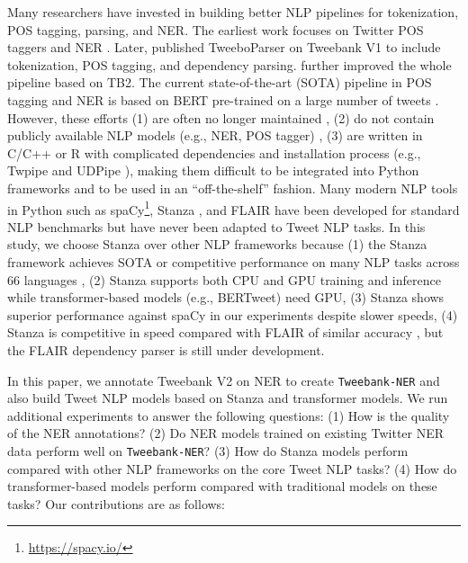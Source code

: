 \documentclass[10pt, a4paper]{article}
\begin{document}
Many researchers have invested in building better NLP pipelines for tokenization, POS tagging, parsing, and NER. The earliest work focuses on Twitter POS taggers \cite{gimpel2010part,owoputi2013improved} and NER \cite{ritter2011named}. Later,  published TweeboParser on Tweebank V1 to include tokenization, POS tagging, and dependency parsing.  further improved the whole pipeline based on TB2. The current state-of-the-art (SOTA) pipeline in POS tagging and NER is based on BERT pre-trained on a large number of tweets . However, these efforts (1) are often no longer maintained \cite{ritter2011named,kong2014dependency}, (2) do not contain publicly available NLP models (e.g., NER, POS tagger) \cite{nguyen2020bertweet}, (3) are written in C/C++ or R with complicated dependencies and installation process (e.g., Twpipe \cite{liu2018parsing} and UDPipe \cite{straka2016udpipe}), making them difficult to be integrated into Python frameworks and to be used in an ``off-the-shelf'' fashion.  Many modern NLP tools in Python such as spaCy\footnote{\url{https://spacy.io/}}, Stanza \cite{qi2020stanza}, and FLAIR \cite{akbik2019flair} have been developed for standard NLP benchmarks but have never been adapted to Tweet NLP tasks. In this study, we choose Stanza over other NLP frameworks because (1) the Stanza framework achieves SOTA or competitive performance on many NLP tasks across 66 languages \cite{qi2020stanza}, (2) Stanza supports both CPU and GPU training and inference while transformer-based models (e.g., BERTweet) need GPU, (3) Stanza shows superior performance against spaCy in our experiments despite slower speeds, (4) Stanza is competitive in speed compared with FLAIR of similar accuracy \cite{qi2020stanza}, but the FLAIR dependency parser is still under development. 





In this paper, we annotate Tweebank V2 on NER to create \texttt{Tweebank-NER} and also build Tweet NLP models based on Stanza and transformer models.  We run additional experiments to answer the following questions: (1) How is the quality of the NER annotations? (2) Do NER models trained on existing Twitter NER data perform well on \texttt{Tweebank-NER}? (3) How do Stanza models perform compared with other NLP frameworks on the core Tweet NLP tasks? (4) How do transformer-based models perform compared with traditional models on these tasks? Our contributions are as follows:
\end{document}
